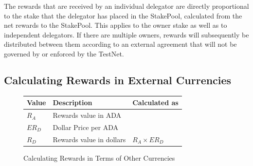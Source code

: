 \documentclass[11pt,a4paper,dvipsnames,twosided,final]{article}
\newcommand{\ada}{ADA{}}
\begin{document}
\noindent
The rewards that are received by an individual delegator are directly proportional to the
stake that the delegator has placed in the StakePool, calculated from the net rewards to the
StakePool.  This applies to the owner stake as well as to independent delegators.
If there are multiple owners, rewards will subsequently be distributed between them according to an external
agreement that will not be governed by or enforced by the TestNet.




\subsection{Calculating Rewards in External Currencies}
\label{sec:conversion}

\begin{figure}[h!]
\begin{center}
\begin{tabular}{||l|p{6cm}|l||}
  \hline \hline
\textbf{Value} & \textbf{Description} & \textbf{Calculated as} \\\hline
$R_A$ &  Rewards value in \ada{} &\\\hline
$ER_D$ &  Dollar Price per \ada{} &\\\hline
$R_D$ &  Rewards value in dollars & $R_A \times ER_D$ \\\hline
\hline
\end{tabular}
\end{center}
\caption{Calculating Rewards in Terms of Other Currencies}
\label{fig:monetary}
\end{figure}
\end{document}
